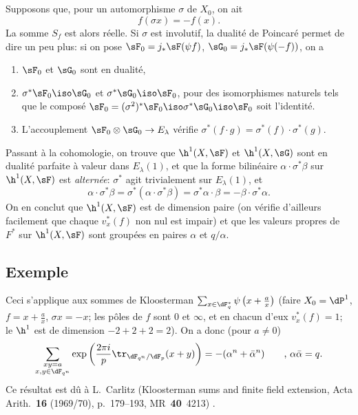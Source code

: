 \subsection{}\label{VI:3-6}

Supposons que, pour un automorphisme $\sigma$ de $X_0$, on ait 
\[
  f(\sigma x) = - f(x) \text{.} 
\]
La somme $S_f$ est alors réelle. Si $\sigma$ est involutif, la dualité de 
Poincaré permet de dire un peu plus: si on pose 
$\sF_0=j_\ast \sF(\psi f)$, $\sG_0 = j_\ast \sF(\psi(-f))$, on a 
\begin{enumerate}[\indent a)]
  \item $\sF_0$ et $\sG_0$ sont en dualité, 
  \item $\sigma^\ast \sF_0 \iso \sG_0$ et $\sigma^\ast \sG_0 \iso \sF_0$, pour 
    des isomorphismes naturels tels que le composé 
    $\sF_0=(\sigma^2)^\ast \sF_0 \iso \sigma^\ast \sG_0 \iso \sF_0$ soit 
    l'identité. 
  \item L'accouplement $\sF_0\otimes \sG_0 \to E_\lambda$ vérifie 
    $\sigma^\ast(f\cdot g) = \sigma^\ast(f) \cdot \sigma^\ast (g)$. 
\end{enumerate} 

Passant à la cohomologie, on trouve que $\h^1(X,\sF)$ et $\h^1(X,\sG)$ sont en 
dualité parfaite à valeur dans $E_\lambda(1)$, et que la forme bilinéaire 
$\alpha\cdot \sigma^\ast\beta$ sur $\h^1(X,\sF)$ est \emph{alternée}: 
$\sigma^\ast$ agit trivialement sur $E_\lambda(1)$, et 
\[
  \alpha\cdot \sigma^\ast \beta = \sigma^\ast(\alpha\cdot \sigma^\ast \beta) = \sigma^\ast \alpha\cdot \beta = -\beta\cdot \sigma^\ast \alpha \text{.} 
\]
On en conclut que $\h^1(X,\sF)$ est de dimension paire (on vérifie d'ailleurs 
facilement que chaque $v_x^\ast(f)$ non nul est impair) et que les valeurs 
propres de $F^\ast$ sur $\h^1(X,\sF)$ sont groupées en paires $\alpha$ et 
$q/\alpha$. 





\subsection{Exemple}\label{VI:3-7}

Ceci s'applique aux sommes de Kloosterman 
$\sum_{x\in \dF_q^\ast} \psi\left(x+\frac a x\right)$ (faire 
$X_0=\dP^1$, $f=x+\frac a x$, $\sigma x=-x$; les pôles de $f$ sont $0$ et 
$\infty$, et en chacun d'eux $v_x^\ast(f)=1$; le $\h^1$ est de dimension 
$-2+2+2=2$). On a donc (pour $a\ne 0$) 
\[
  \sum_{\substack{x y=a \\ x,y\in \dF_{q^n}}} \exp\left(\frac{2\pi i}{p} \tr_{\dF_{q^n}/\dF_p}(x+y)\right) = -(\alpha^n+\bar\alpha^n) \qquad \text{, }\alpha\bar \alpha = q \text{.} 
\]
Ce résultat est dû à L.\ Carlitz (Kloosterman sums and finite field extension, Acta Arith.~\textbf{16} (1969/70), p.~179--193, MR~\textbf{40}~4213) \cite{ca69}. 

